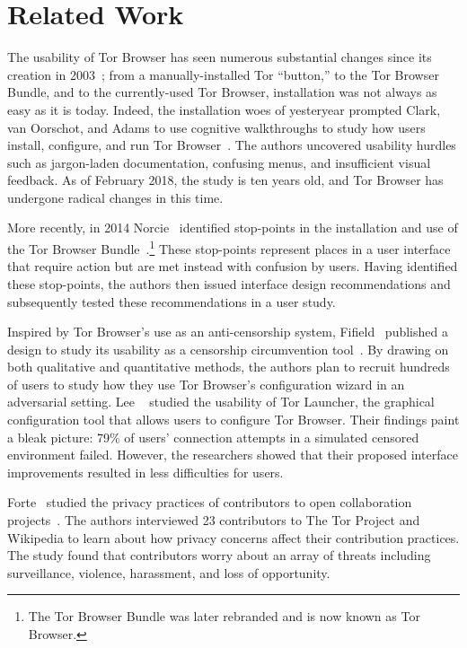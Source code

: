 \section{Related Work}
\label{sec:related-work}

The usability of Tor Browser has seen numerous substantial changes since its
creation in 2003~\cite{Syverson2005a}; from a manually-installed Tor ``button,''
to the Tor Browser Bundle, and to the currently-used Tor Browser, installation was
not always as easy as it is today. Indeed, the installation woes of yesteryear
prompted Clark, van Oorschot, and Adams 
to use cognitive walkthroughs to study how users install, configure, and run
Tor Browser~\cite{Clark2007a}.  The authors uncovered usability hurdles such as
jargon-laden documentation, confusing menus, and insufficient visual feedback.
As of February 2018, the study is ten years old, and Tor Browser has undergone
radical changes in this time.

More recently, in 2014 Norcie \ea\ identified stop-points in the
installation and use of the Tor Browser Bundle~\cite{Norcie2014a}.\footnote{The
Tor Browser Bundle was later rebranded and is now known as Tor Browser.}  These
stop-points represent places in a user interface that require action but are met
instead with confusion by users.  Having identified these stop-points, the
authors then issued interface design recommendations and subsequently tested
these recommendations in a user study.

Inspired by Tor Browser's use as an anti-censorship system, Fifield \ea\ published
a design to study its usability as a censorship circumvention
tool~\cite{Fifield2015a}.  By drawing on both qualitative and quantitative
methods, the authors plan to recruit hundreds of users to study how they use Tor
Browser's configuration wizard in an adversarial setting.  Lee
\ea~\cite{Lee2017a} studied the usability of Tor Launcher, the graphical
configuration tool that allows users to configure Tor Browser.  Their findings
paint a bleak picture: 79\% of users' connection attempts in a simulated
censored environment failed.  However, the researchers showed that their
proposed interface improvements resulted in less difficulties for users.

Forte \ea\ studied the privacy practices of contributors to open collaboration
projects~\cite{Forte2017a}.  The authors interviewed 23 contributors to The Tor
Project and Wikipedia to learn about how privacy concerns affect their
contribution practices.  The study found that contributors worry about an array
of threats including surveillance, violence, harassment, and loss of
opportunity.

